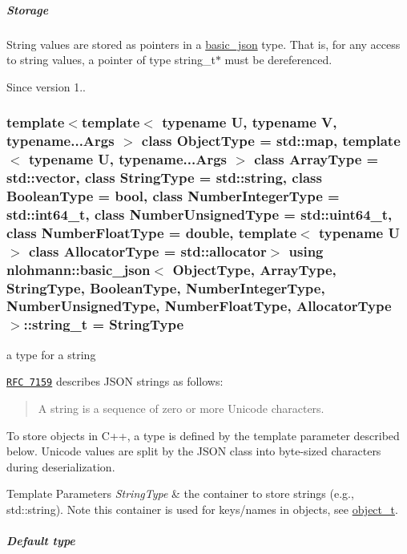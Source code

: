 \subparagraph*{Storage}

String values are stored as pointers in a \hyperlink{classnlohmann_1_1basic__json}{basic\-\_\-json} type. That is, for any access to string values, a pointer of type {\ttfamily string\-\_\-t$\ast$} must be dereferenced.

\begin{DoxySince}{Since}
version 1.. 
\end{DoxySince}
\hypertarget{classnlohmann_1_1basic__json_ab63e618bbb0371042b1bec17f5891f42}{
\subsubsection[{string\-\_\-t}]{\setlength{\rightskip}{0pt plus 5cm}template$<$template$<$ typename U, typename V, typename...\-Args $>$ class Object\-Type = std\-::map, template$<$ typename U, typename...\-Args $>$ class Array\-Type = std\-::vector, class String\-Type  = std\-::string, class Boolean\-Type  = bool, class Number\-Integer\-Type  = std\-::int64\-\_\-t, class Number\-Unsigned\-Type  = std\-::uint64\-\_\-t, class Number\-Float\-Type  = double, template$<$ typename U $>$ class Allocator\-Type = std\-::allocator$>$ using {\bf nlohmann\-::basic\-\_\-json}$<$ Object\-Type, Array\-Type, String\-Type, Boolean\-Type, Number\-Integer\-Type, Number\-Unsigned\-Type, Number\-Float\-Type, Allocator\-Type $>$\-::{\bf string\-\_\-t} =  String\-Type}}\label{classnlohmann_1_1basic__json_ab63e618bbb0371042b1bec17f5891f42}


a type for a string 

\href{http://rfc7159.net/rfc7159}{\tt R\-F\-C 7159} describes J\-S\-O\-N strings as follows\-: \begin{quotation}
A string is a sequence of zero or more Unicode characters.

\end{quotation}


To store objects in C++, a type is defined by the template parameter described below. Unicode values are split by the J\-S\-O\-N class into byte-\/sized characters during deserialization.


\begin{DoxyTemplParams}{Template Parameters}
{\em String\-Type} & the container to store strings (e.\-g., {\ttfamily std\-::string}). Note this container is used for keys/names in objects, see \hyperlink{classnlohmann_1_1basic__json_a0ac9894c9de8dc551cf2e5f1c605537f}{object\-\_\-t}.\\
\hline
\end{DoxyTemplParams}
\subparagraph*{Default type}

